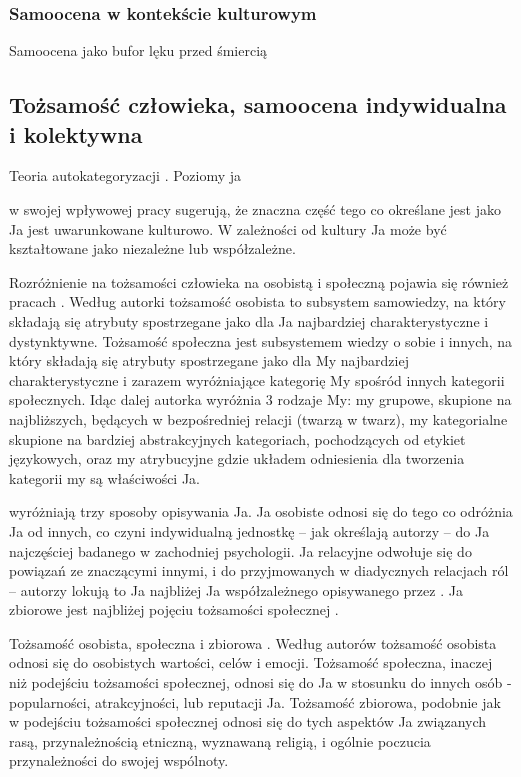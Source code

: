 \documentclass[man]{apa6}
\begin{document}
\subsubsection{Samoocena w kontekście kulturowym}



Samoocena jako bufor lęku przed śmiercią \parencite{pyszczynski2004people}
\newpage

\subsection{Tożsamość człowieka, samoocena indywidualna i kolektywna}

Teoria autokategoryzacji \parencite{turner1994self}.
Poziomy ja \parencite{brewer2007importance}

\textcite{markus1991culture} w swojej wpływowej pracy sugerują, że znaczna część tego co określane jest jako Ja jest uwarunkowane kulturowo. W zależności od kultury Ja może być kształtowane jako niezależne lub współzależne.

Rozróżnienie na tożsamości człowieka na osobistą i społeczną pojawia się również pracach \textcite{jarymowicz1994poznawcza}. Według autorki tożsamość osobista to subsystem samowiedzy, na który składają się atrybuty spostrzegane jako dla Ja najbardziej charakterystyczne i dystynktywne. Tożsamość społeczna jest subsystemem wiedzy o sobie i innych, na który składają się atrybuty spostrzegane jako dla My najbardziej charakterystyczne i zarazem wyróżniające kategorię My spośród innych kategorii społecznych. Idąc dalej autorka wyróżnia 3 rodzaje My: my grupowe, skupione na najbliższych, będących w bezpośredniej relacji (twarzą w twarz), my kategorialne
skupione na bardziej abstrakcyjnych kategoriach, pochodzących od etykiet językowych, oraz my atrybucyjne gdzie układem odniesienia dla tworzenia kategorii my są właściwości Ja.

\textcite{brewer1996we} wyróżniają trzy sposoby opisywania Ja. Ja osobiste odnosi się do tego co odróżnia Ja od innych, co czyni indywidualną jednostkę -- jak określają autorzy -- do Ja najczęściej badanego w zachodniej psychologii. Ja relacyjne odwołuje się do powiązań ze znaczącymi innymi, i do przyjmowanych w diadycznych relacjach ról -- autorzy lokują to Ja najbliżej Ja współzależnego opisywanego przez \textcite{markus1991culture}. Ja zbiorowe jest najbliżej pojęciu tożsamości społecznej \parencite{hogg1988social, turner1987rediscovering}.

Tożsamość osobista, społeczna i zbiorowa \parencite{cheek1989identity}. Według autorów tożsamość osobista odnosi się do osobistych wartości, celów i emocji. Tożsamość społeczna, inaczej niż podejściu tożsamości społecznej, odnosi się do Ja w stosunku do innych osób - popularności, atrakcyjności, lub reputacji Ja. Tożsamość zbiorowa, podobnie jak w podejściu tożsamości społecznej odnosi się do tych aspektów Ja związanych rasą, przynależnością etniczną, wyznawaną religią, i ogólnie poczucia przynależności do swojej wspólnoty. \\
\end{document}
